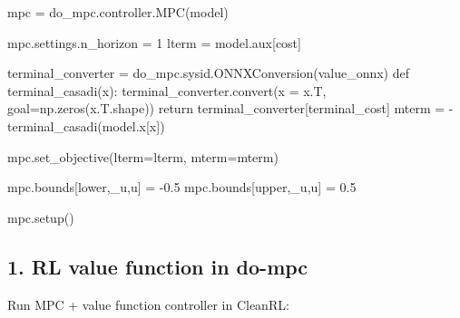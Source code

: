 \documentclass[
  letterpaper,
  DIV=11,
  numbers=noendperiod,
  oneside]{scrartcl}
\newenvironment{Shaded}{\begin{snugshade}}{\end{snugshade}}
\newcommand{\ControlFlowTok}[1]{\textcolor[rgb]{0.00,0.23,0.31}{#1}}
\newcommand{\DecValTok}[1]{\textcolor[rgb]{0.68,0.00,0.00}{#1}}
\newcommand{\FloatTok}[1]{\textcolor[rgb]{0.68,0.00,0.00}{#1}}
\newcommand{\KeywordTok}[1]{\textcolor[rgb]{0.00,0.23,0.31}{#1}}
\newcommand{\NormalTok}[1]{\textcolor[rgb]{0.00,0.23,0.31}{#1}}
\newcommand{\OperatorTok}[1]{\textcolor[rgb]{0.37,0.37,0.37}{#1}}
\newcommand{\StringTok}[1]{\textcolor[rgb]{0.13,0.47,0.30}{#1}}
\begin{document}
\begin{Shaded}
\begin{Highlighting}[numbers=left,,]
\NormalTok{mpc }\OperatorTok{=}\NormalTok{ do\_mpc.controller.MPC(model)}

\NormalTok{mpc.settings.n\_horizon }\OperatorTok{=} \DecValTok{1}
\NormalTok{lterm }\OperatorTok{=}\NormalTok{ model.aux[}\StringTok{\textquotesingle{}cost\textquotesingle{}}\NormalTok{] }

\NormalTok{terminal\_converter }\OperatorTok{=}\NormalTok{ do\_mpc.sysid.ONNXConversion(value\_onnx)}
\KeywordTok{def}\NormalTok{ terminal\_casadi(x):}
\NormalTok{    terminal\_converter.convert(x }\OperatorTok{=}\NormalTok{ x.T, goal}\OperatorTok{=}\NormalTok{np.zeros(x.T.shape))}
    \ControlFlowTok{return}\NormalTok{ terminal\_converter[}\StringTok{\textquotesingle{}terminal\_cost\textquotesingle{}}\NormalTok{]}
\NormalTok{mterm }\OperatorTok{=} \OperatorTok{{-}}\NormalTok{terminal\_casadi(model.x[}\StringTok{\textquotesingle{}x\textquotesingle{}}\NormalTok{])}

\NormalTok{mpc.set\_objective(lterm}\OperatorTok{=}\NormalTok{lterm, mterm}\OperatorTok{=}\NormalTok{mterm)}

\NormalTok{mpc.bounds[}\StringTok{\textquotesingle{}lower\textquotesingle{}}\NormalTok{,}\StringTok{\textquotesingle{}\_u\textquotesingle{}}\NormalTok{,}\StringTok{\textquotesingle{}u\textquotesingle{}}\NormalTok{] }\OperatorTok{=} \OperatorTok{{-}}\FloatTok{0.5}
\NormalTok{mpc.bounds[}\StringTok{\textquotesingle{}upper\textquotesingle{}}\NormalTok{,}\StringTok{\textquotesingle{}\_u\textquotesingle{}}\NormalTok{,}\StringTok{\textquotesingle{}u\textquotesingle{}}\NormalTok{] }\OperatorTok{=}  \FloatTok{0.5}

\NormalTok{mpc.setup()}
\end{Highlighting}
\end{Shaded}

\subsection{1. RL value function in
do-mpc}\label{rl-value-function-in-do-mpc-3}

Run MPC + value function controller in CleanRL:
\end{document}
